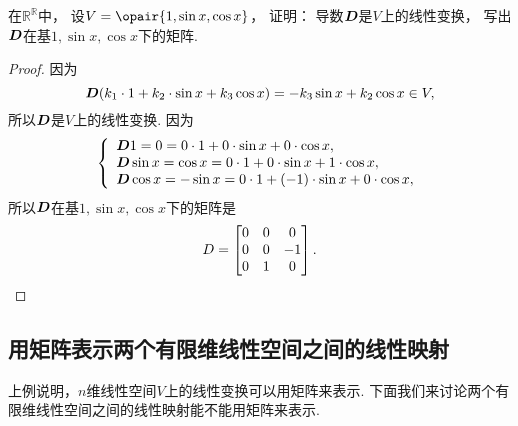 \begin{example}
在\(\mathbb{R}^\mathbb{R}\)中，
设\(V=\opair{1,\sin x,\cos x}\)，
证明：
导数\(\boldsymbol{D}\)是\(V\)上的线性变换，
写出\(\boldsymbol{D}\)在基\(1,\sin x,\cos x\)下的矩阵.
\begin{proof}
因为\[
	\boldsymbol{D}(k_1\cdot1+k_2\cdot\sin x+k_3\cos x)
	=-k_3\sin x+k_2\cos x
	\in V,
\]
所以\(\boldsymbol{D}\)是\(V\)上的线性变换.
因为\[
	\left\{ \begin{array}{l}
		\boldsymbol{D}1
		=0
		=0\cdot1+0\cdot\sin x+0\cdot\cos x, \\
		\boldsymbol{D}\sin x
		=\cos x
		=0\cdot1+0\cdot\sin x+1\cdot\cos x, \\
		\boldsymbol{D}\cos x
		=-\sin x
		=0\cdot1+(-1)\cdot\sin x+0\cdot\cos x,
	\end{array} \right.
\]
所以\(\boldsymbol{D}\)在基\(1,\sin x,\cos x\)下的矩阵是\[
	D=\begin{bmatrix}
		0 & 0 & 0 \\
		0 & 0 & -1 \\
		0 & 1 & 0
	\end{bmatrix}.
	\qedhere
\]
\end{proof}
\end{example}

\subsection{用矩阵表示两个有限维线性空间之间的线性映射}
上例说明，\(n\)维线性空间\(V\)上的线性变换可以用矩阵来表示.
下面我们来讨论两个有限维线性空间之间的线性映射能不能用矩阵来表示.

